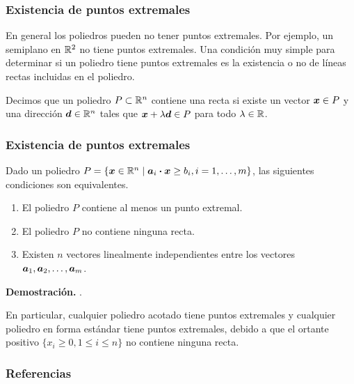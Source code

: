 \documentclass[aspectratio=169,12pt,spanish]{beamer}
\begin{document}
\begin{frame}
\frametitle{Existencia de puntos extremales}

En general los poliedros pueden no tener puntos extremales. Por ejemplo, un semiplano en $\mathbb{R}^2$ no tiene puntos extremales.
Una condición muy simple para determinar si un poliedro tiene puntos extremales es la existencia o no de líneas rectas incluidas en el poliedro.

Decimos que un poliedro $P \subset \mathbb{R}^n$ contiene una recta si existe un vector $\bm{x} \in P$ y una dirección $\bm{d} \in \mathbb{R}^n$ tales que $\bm{x} + \lambda \bm{d} \in P$ para todo $\lambda \in \mathbb{R}$.


\end{frame}


\begin{frame}
\frametitle{Existencia de puntos extremales}

\begin{theorem}
Dado un poliedro $P = \{\bm{x} \in \mathbb{R}^n \mid \bm{a}_i \boldsymbol{\cdot} \bm{x} \ge b_i, i = 1, \dots, m\}$, las siguientes condiciones son equivalentes.

\begin{enumerate}
\item El poliedro $P$ contiene al menos un punto extremal.
\item El poliedro $P$ no contiene ninguna recta.
\item Existen $n$ vectores linealmente independientes entre los vectores $\bm{a}_1, \bm{a}_2, \dots, \bm{a}_m$.
\end{enumerate}
\end{theorem}

\textbf{Demostración.} \cite[Teorema 2.6]{Bertsimas1997}.

En particular, cualquier poliedro acotado tiene puntos extremales y cualquier poliedro en forma estándar tiene puntos extremales, debido a que el ortante positivo $\{x_i \ge 0, 1 \le i \le n\}$ no contiene ninguna recta.

\end{frame}


\begin{frame}
\frametitle{Referencias}




\end{frame}
\end{document}
